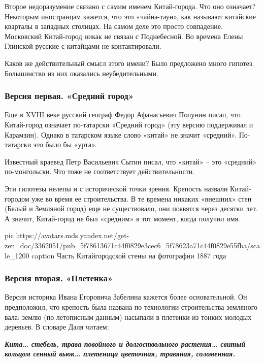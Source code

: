 Второе недоразумение связано с самим именем Китай-города. Что оно означает?
Некоторым иностранцам кажется, что это «чайна-таун», как называют китайские
кварталы в западных столицах. На самом деле это просто совпадение. Московский
Китай-город никак не связан с Поднебесной. Во времена Елены Глинской русские с
китайцами не контактировали.

Каков же действительный смысл этого имени? Было предложено много гипотез.
Большинство из них оказались неубедительными.

\subsubsection{Версия первая. «Средний город»}

Еще в XVIII веке русский географ Федор Афанасьевич Полунин писал, что
Китай-город означает по-татарски «Средний город» (эту версию поддерживал и
Карамзин). Однако в татарском языке слово «китай» не значит «средний».
По-татарски это было бы «урта».

Известный краевед Петр Васильевич Сытин писал, что «китай» – это «средний»
по-монгольски. Что тоже не соответствует действительности.

Эти гипотезы нелепы и с исторической точки зрения. Крепость назвали
Китай-городом уже во время ее строительства. В те времена никаких «внешних»
стен (Белый и Земляной город) еще не существовало, они появятся через десятки
лет. А значит, Китай-город не был «средним» в тот момент, когда получил имя.

\ifcmt
pic https://avatars.mds.yandex.net/get-zen_doc/3362051/pub_5f78613671c44f0829e3cec6_5f78623a71c44f0829e55fba/scale_1200
caption Часть Китайгородской стены на фотографии 1887 года
\fi

\subsubsection{Версия вторая. «Плетенка»}

Версия историка Ивана Егоровича Забелина кажется более основательной. Он
предположил, что крепость была названа по технологии строительства земляного
вала: землю (по летописным данным) насыпали в плетенки из тонких молодых
деревьев. В словаре Даля читаем:

\begin{leftbar}
  \begingroup
    \em\Large\bfseries\color{blue}
Кита… стебель, трава повойного и долгоствольного растения… свитый кольцом
сенный вьюк… плетеница цветочная, травяная, соломенная.
  \endgroup
\end{leftbar}

